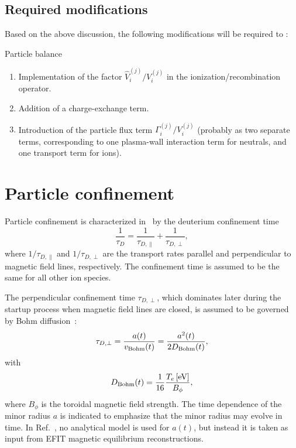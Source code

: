 \documentclass{notes}
\begin{document}
    \subsection{Required modifications}
    Based on the above discussion, the following modifications will be required
    to \DREAM:
    \begin{summarybox}{Particle balance}
        \begin{enumerate}
            \item Implementation of the factor $\hat{V}_i^{(j)}/V_i^{(j)}$ in
            the ionization/recombination operator.
            \item Addition of a charge-exchange term.
            \item Introduction of the particle flux term
            $\Gamma_i^{(j)}/V_i^{(j)}$ (probably as two separate terms,
            corresponding to one plasma-wall interaction term for neutrals, and
            one transport term for ions).
        \end{enumerate}
    \end{summarybox}

    \section{Particle confinement}\label{sec:confinement}
    Particle confinement is characterized in \DYON\ by the deuterium confinement
    time
    \begin{equation}
        \frac{1}{\tau_D} = \frac{1}{\tau_{D,\|}} + \frac{1}{\tau_{D,\perp}},
    \end{equation}
    where $1/\tau_{D,\|}$ and $1/\tau_{D,\perp}$ are the transport rates
    parallel and perpendicular to magnetic field lines, respectively. The
    confinement time is assumed to be the same for all other ion species.

    The perpendicular confinement time $\tau_{D,\perp}$, which dominates later
    during the startup process when magnetic field lines are closed, is assumed
    to be governed by Bohm diffusion~\cite{delaCal2006}:
    \begin{equation}\label{eq:tauPerp}
        \tau_{D,\perp} = \frac{a(t)}{v_{\rm Bohm}(t)} = \frac{a^2(t)}{2D_{\rm Bohm}(t)},
    \end{equation}
    with
    \begin{equation}
        D_{\rm Bohm}(t) = \frac{1}{16}\frac{T_e\,\mathrm{[eV]}}{B_\phi},
    \end{equation}
    where $B_\phi$ is the toroidal magnetic field strength. The time dependence
    of the minor radius $a$ is indicated to emphasize that the minor radius may
    evolve in time. In Ref.~\cite{Kim2012}, no analytical model is used for
    $a(t)$, but instead it is taken as input from EFIT magnetic equilibrium
    reconstructions.
\end{document}
